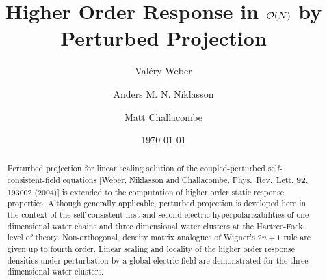\documentclass[prl,aps,preprint,showpacs,superbib]{revtex4}
\begin{document}
\title{Higher Order Response in ${\cal O}(N)$ by Perturbed Projection} 

\author{Val\'ery Weber}
\author{Anders M. N. Niklasson}
\author{Matt Challacombe}

\date{\today}

\begin{abstract}
Perturbed projection  for linear scaling solution of the coupled-perturbed 
self-consistent-field equations 
[Weber, Niklasson and  Challacombe, Phys.\ Rev.\ Lett. {\bf 92}, 193002 (2004)] 
is extended to the computation of higher order static response properties.
Although generally applicable, perturbed projection is developed here 
in the context of the self-consistent first and second electric hyperpolarizabilities 
of one dimensional water chains and three dimensional water clusters at the 
Hartree-Fock level of theory. 
Non-orthogonal, density matrix analogues of Wigner's $2n+1$ rule are given up to fourth order.
Linear scaling and locality of the higher order response densities under perturbation 
by a global electric field are demonstrated for the three dimensional water clusters.  
\end{abstract}



\maketitle
\end{document}
